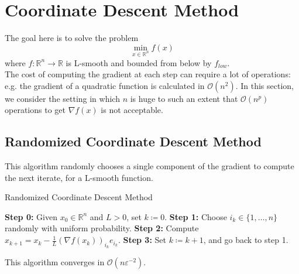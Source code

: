 \documentclass[12pt, openany]{report}
\newcommand{\R}{\mathbb{R}}
\theoremstyle{definition}
\begin{document}
\chapter{Coordinate Descent Method}
The goal here is to solve the problem
\begin{equation}
    \min_{x\in \R^n}f(x) 
\end{equation}
where \(f:\R^n\rightarrow \R\) is L-smooth and bounded from below by \(f_{low}\).\\

The cost of computing the gradient at each step can require a lot of operations: e.g. the gradient of a quadratic function is calculated in \(\mathcal{O}(n^2)\). In this section, we consider the setting in which \(n\) is huge to such an extent that \(\mathcal{O}(n^p)\) operations to get \(\nabla f(x)\) is not acceptable. 
\section{Randomized Coordinate Descent Method}
This algorithm randomly chooses a single component of the gradient to compute the next iterate, for a L-smooth function.
\begin{algorithm}\label{algo:random_CDM}
    \caption{Randomized Coordinate Descent Method}
    \begin{algorithmic}[1]
    \State \textbf{Step 0:} Given $x_0 \in \mathbb{R}^n$ and $L > 0$, set $k \coloneqq 0$.
    \State \textbf{Step 1:} Choose \(i_k\in \{1,\dots,n\}\) randomly with uniform probability. 
    \State \textbf{Step 2:} Compute $x_{k+1} = x_k - \frac{1}{L}\left(\nabla f(x_k)\right)_{i_k}e_{i_k}$.
    \State \textbf{Step 3:} Set \(k\coloneqq k+1\), and go back to step 1.
    \end{algorithmic}
\end{algorithm}
This algorithm converges in \(\mathcal{O}(n\varepsilon^{-2})\). 
\end{document}
